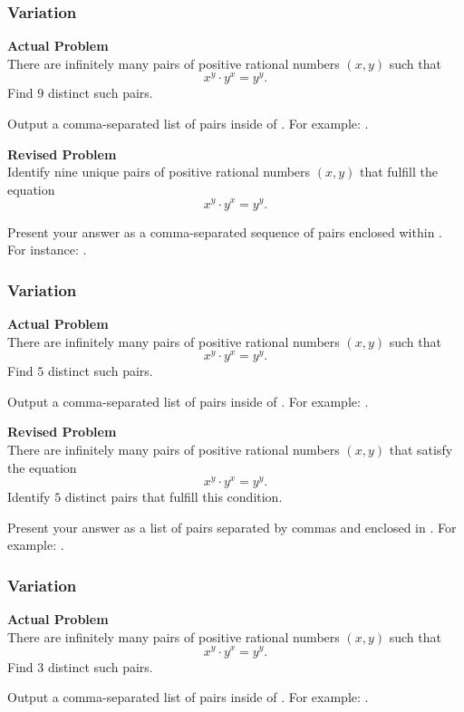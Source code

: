 \subsubsection{Variation}
\textbf{Actual Problem}\\
There are infinitely many pairs of positive rational numbers $(x, y)$ such that 
$$ 
x^y \cdot y^x = y^y.
$$ 
Find $9$ distinct such pairs. 


Output a comma-separated list of pairs inside of \boxed. For example: .

\textbf{Revised Problem}\\
Identify nine unique pairs of positive rational numbers \((x, y)\) that fulfill the equation 
\[
x^y \cdot y^x = y^y.
\]

Present your answer as a comma-separated sequence of pairs enclosed within \boxed. For instance: .

\subsubsection{Variation}
\textbf{Actual Problem}\\
There are infinitely many pairs of positive rational numbers $(x, y)$ such that 
$$ 
x^y \cdot y^x = y^y.
$$ 
Find $5$ distinct such pairs. 


Output a comma-separated list of pairs inside of \boxed. For example: .

\textbf{Revised Problem}\\
There are infinitely many pairs of positive rational numbers \((x, y)\) that satisfy the equation 
$$ 
x^y \cdot y^x = y^y.
$$ 
Identify $5$ distinct pairs that fulfill this condition.

Present your answer as a list of pairs separated by commas and enclosed in \boxed. For example: .

\subsubsection{Variation}
\textbf{Actual Problem}\\
There are infinitely many pairs of positive rational numbers $(x, y)$ such that 
$$ 
x^y \cdot y^x = y^y.
$$ 
Find $3$ distinct such pairs. 


Output a comma-separated list of pairs inside of \boxed. For example: .

